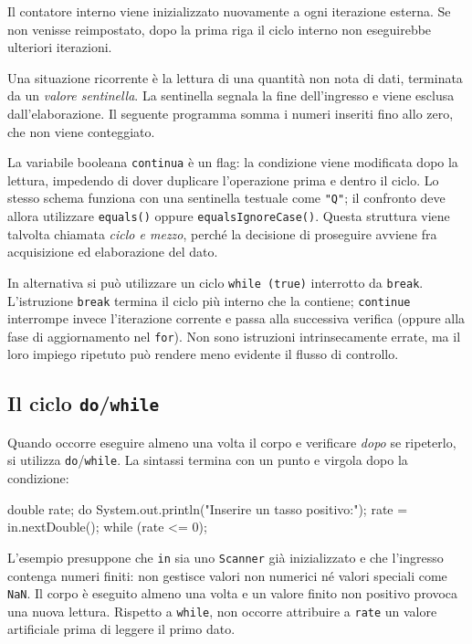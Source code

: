 Il contatore interno viene inizializzato nuovamente a ogni
iterazione esterna. Se non venisse reimpostato, dopo la prima
riga il ciclo interno non eseguirebbe ulteriori iterazioni.

Una situazione ricorrente è la lettura di una quantità non nota di
dati, terminata da un \emph{valore sentinella}. La sentinella
segnala la fine dell'ingresso e viene esclusa dall'elaborazione.
Il seguente programma somma i numeri inseriti fino allo zero, che
non viene conteggiato.



La variabile booleana \texttt{continua} è un flag: la condizione
viene modificata dopo la lettura, impedendo di dover duplicare
l'operazione prima e dentro il ciclo. Lo stesso schema funziona
con una sentinella testuale come \texttt{"Q"}; il confronto deve
allora utilizzare \texttt{equals()} oppure
\texttt{equalsIgnoreCase()}.
Questa struttura viene talvolta chiamata \emph{ciclo e mezzo},
perché la decisione di proseguire avviene fra acquisizione ed
elaborazione del dato.

In alternativa si può utilizzare un ciclo \texttt{while (true)}
interrotto da \texttt{break}. L'istruzione \texttt{break}
termina il ciclo più interno che la contiene; \texttt{continue}
interrompe invece l'iterazione corrente e passa alla successiva
verifica (oppure alla fase di aggiornamento nel \texttt{for}).
Non sono istruzioni intrinsecamente errate, ma il loro impiego
ripetuto può rendere meno evidente il flusso di controllo.

\subsection{Il ciclo \texttt{do}/\texttt{while}}
\label{sec:fi-java-cicli-do-while}

Quando occorre eseguire almeno una volta il corpo e verificare
\emph{dopo} se ripeterlo, si utilizza \texttt{do}/\texttt{while}.
La sintassi termina con un punto e virgola dopo la condizione:

\begin{unipdcode}[language=Java]
double rate;
do {
    System.out.println("Inserire un tasso positivo:");
    rate = in.nextDouble();
} while (rate <= 0);
\end{unipdcode}

L'esempio presuppone che \texttt{in} sia uno \texttt{Scanner}
già inizializzato e che l'ingresso contenga numeri finiti:
non gestisce valori non numerici né valori speciali come
\texttt{NaN}. Il corpo è eseguito almeno una volta e
un valore finito non positivo provoca una nuova lettura.
Rispetto a \texttt{while}, non occorre attribuire a \texttt{rate}
un valore artificiale prima di leggere il primo dato.

